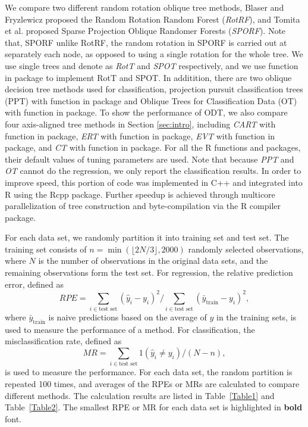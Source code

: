 \documentclass[nojss]{jss}
\newcommand{\fct}[1]{\code{#1()}}
\numberwithin{equation}{section}
\begin{document}
We compare two different random rotation oblique tree methods, Blaser and Fryzlewicz\cite{blaser2016random} proposed the Random Rotation Random Forest (\emph{RotRF}), and Tomita et al.\cite{tomita2020sparse} proposed Sparse Projection Oblique Randomer Forests (\emph{SPORF}). Note that, SPORF unlike RotRF, the random rotation in SPORF is carried out at separately each node, as opposed to using a single rotation for the whole tree. We use single trees and denote as \emph{RotT} and \emph{SPOT} respectively, and we use function \fct{ODT} in  package to implement RotT and  SPOT. In additition, there are two oblique decision tree methods used for classification, projection pursuit classification trees (PPT) \cite{lee2018pptreeviz} with function \fct{PPTreeclass} in  package and Oblique Trees for Classification Data (OT)  \cite{truong2009fast} with function \fct{oblique.tree} in  package. To show the performance of ODT, we also compare four axis-aligned tree methods  in Section \ref{sec:intro}, including \emph{CART} with function \fct{rpart} in  package, \emph{ERT} with function \fct{RLT} in  package, \emph{EVT} with function \fct{evtree} in  package, and \emph{CT} with function \fct{ctree} in  package.
	For all the R functions  and  packages, their default values of tuning parameters are used. Note that because \emph{PPT} and \emph{OT} cannot do the regression, we only report the classification results. In order to improve speed, this portion of code was implemented in C++ and integrated into R using the Rcpp package. Further speedup is achieved through multicore parallelization of tree construction and byte-compilation via the R compiler package.%

For each data set, we randomly partition it into training set and test set. The training set consists of $n=\min(\lfloor 2N/3\rfloor,2000)$ randomly selected observations, where $N$ is the number of observations in the original data sets, and the remaining observations form the test set. For regression, the relative prediction error, defined as
$$RPE=\sum_{i\in \text{test set}}(\hat{y}_i-y_i)^2/\sum_{i\in \text{test set}}(\bar{y}_{\text{train}}-y_i)^2,$$
where $\bar{y}_{\text{train}}$ is naive predictions based on the average of $y$ in the training sets, is used to measure the performance of a method. For classification, the misclassification rate, defined as
$$MR=\sum_{i\in \text{test set}} 1(\hat{y}_i \neq y_i) /(N-n),$$
is used to measure the performance. For each data set, the random partition is repeated 100 times,  and averages of the RPEs or MRs are calculated to compare different methods. The calculation results are listed in Table~\ref{Table1} and Table~\ref{Table2}. The smallest RPE or MR for each data set is highlighted in \textbf{bold} font.
\end{document}
